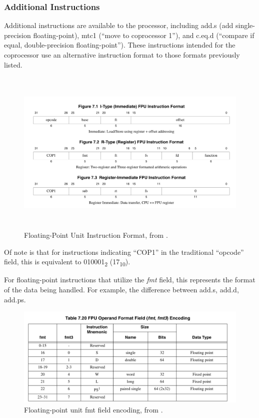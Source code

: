 \documentclass[
    paper=letter,
    parskip=half,
    fontsize=12pt,
    titlepage=firstiscover,
    toc=bibliography,
    numbers=endperiod
]{scrartcl}
\begin{document}


\subsubsection{Additional Instructions}

Additional instructions are available to the processor, including add.s
(add single-precision floating-point), mtc1 (``move to coprocessor 1''),
and c.eq.d (``compare if equal, double-precision floating-point''). These
instructions intended for the coprocessor use an alternative instruction
format to those formats previously listed.

\begin{figure}[H]
    \includegraphics[height=8cm]{fpu-instruction-formats}
    \caption{Floating-Point Unit Instruction Format, from \protect\cite{mips-specification}.}
\end{figure}

Of note is that for instructions indicating ``COP1'' in the traditional
``opcode'' field, this is equivalent to 010001\textsubscript{2}
(17\textsubscript{10}).

For floating-point instructions that utilize the \emph{fmt} field, this
represents the format of the data being handled. For example, the
difference between add.s, add.d, add.ps.

\begin{figure}[H]
    \includegraphics[width=\textwidth]{fpu-fmt-encoding}
    \caption{Floating-point unit fmt field encoding, from \protect\cite[Table~7.20]{mips-specification}.}
\end{figure}
\end{document}
